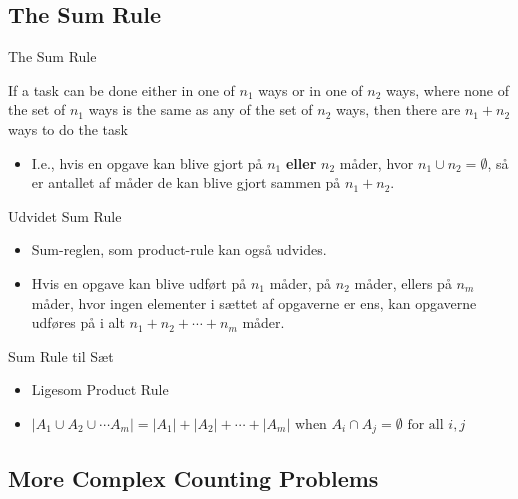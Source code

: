 \documentclass{beamer}
\begin{document}
\subsection{The Sum Rule}
\begin{frame}{The Sum Rule}
   \begin{theorem}
    If a task can be done either in one of $n_1$ ways or in one of $n_2$ ways, where none of the set of $n_1$ ways is the same as any of the set of $n_2$ ways, then there are $n_1 + n_2$ ways to do the task 
   \end{theorem} 
   \begin{itemize}
       \item I.e., hvis en opgave kan blive gjort på $n_1$ \textbf{eller} $n_2$ måder, hvor $n_1 \cup n_2 = \emptyset$, så er antallet af måder de kan blive gjort sammen på $n_1 + n_2$. 
   \end{itemize}
\end{frame}

\begin{frame}{Udvidet Sum Rule}
    \begin{itemize}
        \item Sum-reglen, som product-rule kan også udvides.
        \item Hvis en opgave kan blive udført på $n_1$ måder, på $n_2$ måder, ellers på $n_m$ måder, hvor ingen elementer i sættet af opgaverne er ens, kan opgaverne udføres på i alt $n_1 + n_2 + \cdots + n_m$ måder. 
    \end{itemize}
\end{frame}

\begin{frame}{Sum Rule til Sæt}
    \begin{itemize}
        \item Ligesom Product Rule
        \item $|A_1 \cup A_2 \cup \cdots A_m| = |A_1| + |A_2| + \cdots + |A_m| \text{ when } A_i \cap A_j = \emptyset \text{ for all } i,j$
    \end{itemize}
\end{frame}

\subsection{More Complex Counting Problems}
\end{document}
